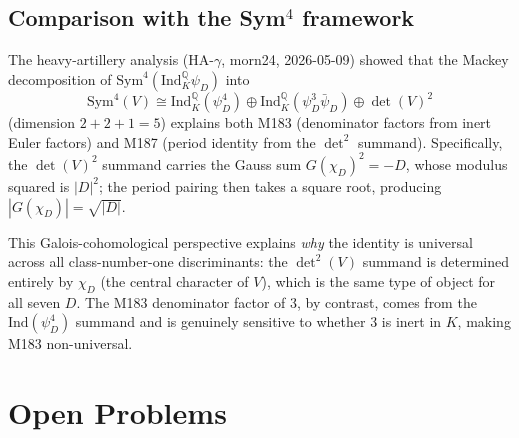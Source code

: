\documentclass[12pt,a4paper]{article}
\theoremstyle{plain}
\theoremstyle{definition}
\newcommand{\Q}{\mathbb{Q}}
\begin{document}
\subsection{Comparison with the Sym$^4$ framework}

The heavy-artillery analysis (HA-$\gamma$, morn24, 2026-05-09) showed that
the Mackey decomposition of $\mathrm{Sym}^4(\mathrm{Ind}_K^\Q \psi_D)$ into
\[
  \mathrm{Sym}^4(V) \cong \mathrm{Ind}_K^\Q(\psi_D^4) \oplus
    \mathrm{Ind}_K^\Q(\psi_D^3 \bar\psi_D) \oplus \det(V)^2
\]
(dimension $2 + 2 + 1 = 5$) explains both M183 (denominator factors from
inert Euler factors) and M187 (period identity from the $\det^2$ summand).
Specifically, the $\det(V)^2$ summand carries the Gauss sum $G(\chi_D)^2 = -D$,
whose modulus squared is $|D|^2$; the period pairing then takes a square
root, producing $|G(\chi_D)| = \sqrt{|D|}$.

This Galois-cohomological perspective explains \emph{why} the identity is
universal across all class-number-one discriminants: the $\det^2(V)$ summand
is determined entirely by $\chi_D$ (the central character of $V$), which is
the same type of object for all seven $D$.  The M183 denominator factor of
3, by contrast, comes from the $\mathrm{Ind}(\psi_D^4)$ summand and is
genuinely sensitive to whether $3$ is inert in $K$, making M183 non-universal.

\section{Open Problems}
\label{sec:open}
\end{document}

